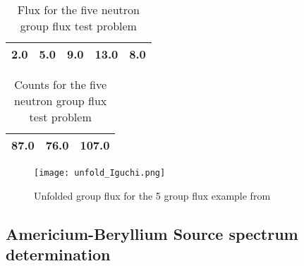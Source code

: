 \documentclass[review]{elsarticle}
\begin{document}
\begin{table}[h!]
	\centering
	\caption{Flux for the five neutron group flux test problem}
	\label{tab:ex1-flux}
	\begin{tabular}{|l|l|l|l|l|}
		\hline
		2.0&5.0&9.0&13.0&8.0 \\ \hline
	\end{tabular}
\end{table}	

\begin{table}[h!]
		\centering
	\caption{Counts for the five neutron group flux test problem}
	\label{tab:ex1-counts}
	\begin{tabular}{|l|l|l|}
		\hline
		87.0&   76.0&  107.0 \\ \hline
	\end{tabular}
\end{table}	


\begin{figure}[h!]
	\centering
\texttt{[image: unfold\_Iguchi.png]}
\caption{Unfolded group flux for the 5 group flux example from \cite{Iguchi}}
\label{fig:Iguchi}
\end{figure}


\subsection{Americium-Beryllium Source spectrum determination}
\end{document}
